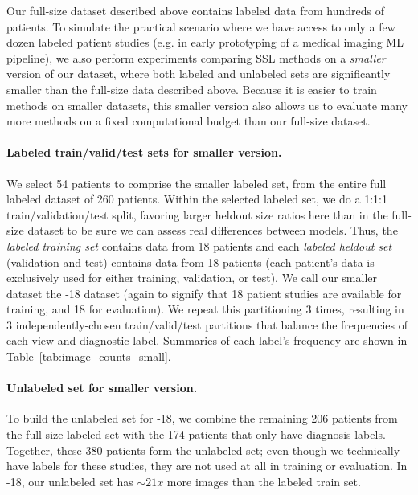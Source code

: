 Our full-size dataset described above contains labeled data from hundreds of patients. To simulate the practical scenario where we have access to only a few dozen labeled patient studies (e.g. in early prototyping of a medical imaging ML pipeline), we also perform experiments comparing SSL methods on a \emph{smaller} version of our dataset, where both labeled and unlabeled sets are significantly smaller than the full-size data described above.
Because it is easier to train methods on smaller datasets, this smaller version also allows us to evaluate many more methods on a fixed computational budget than our full-size dataset.




\paragraph{Labeled train/valid/test sets for smaller version.}
We select 54 patients to comprise the smaller labeled set, from the entire full labeled dataset of 260 patients.
Within the selected labeled set, we do a 1:1:1 train/validation/test split, favoring larger heldout size ratios here than in the full-size dataset to be sure we can assess real differences between models.
Thus, the \emph{labeled training set} contains data from 18 patients and each \emph{labeled heldout set} (validation and test) contains data from 18 patients (each patient's data is exclusively used for either training, validation, or test).
We call our smaller dataset the -18 dataset (again to signify that 18 patient studies are available for training, and 18 for evaluation).
We repeat this partitioning 3 times, resulting in 3 independently-chosen train/valid/test partitions that balance the frequencies of each view and diagnostic label.
Summaries of each label's frequency are shown in Table~\ref{tab:image_counts_small}.

\paragraph{Unlabeled set for smaller version.}
To build the unlabeled set for -18, we combine the remaining 206 patients from the full-size labeled set with the 174 patients that only have diagnosis labels.
Together, these 380 patients form the unlabeled set; even though we technically have labels for these studies, they are not used at all in training or evaluation.
In -18, our unlabeled set has $\sim21x$ more images than the labeled train set.


